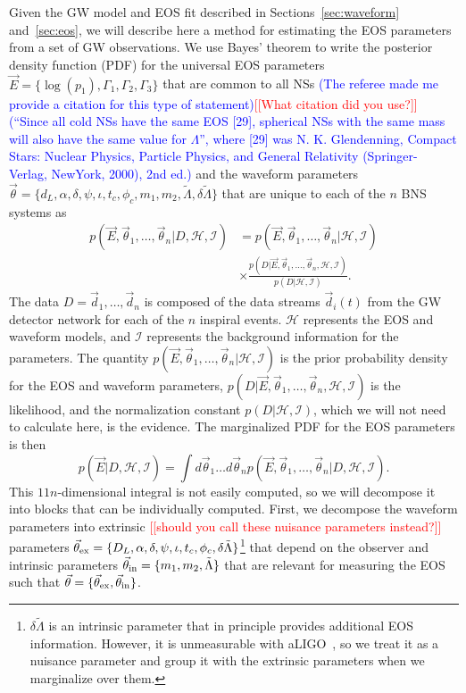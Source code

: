 \documentclass[twocolumn,prd,amssymb,aps,nofootinbib,showpacs,epsf]{revtex4}
\newcommand{\red}{\textcolor{red}}
\newcommand\ben[2]{\textcolor{red}{{#1}\sout{#2}}}
\newcommand\les[2]{\textcolor{blue}{{#1}\sout{#2}}}
\begin{document}
Given the GW model and EOS fit described in Sections~\ref{sec:waveform} and~\ref{sec:eos}, we will describe here a method for estimating the EOS parameters from a set of GW observations. We use Bayes' theorem to write the posterior density function (PDF) for the universal EOS parameters $\vec E = \{\log(p_1), \Gamma_1, \Gamma_2, \Gamma_3\}$ that are common to all NSs \les{(The referee made me provide a citation for this type of statement)}{}\ben{[[What citation did you use?]]}{} \les{(``Since all cold NSs have the same EOS [29], spherical NSs with the same mass will also have the same value for $\Lambda$'', where [29] was N. K. Glendenning, Compact Stars: Nuclear Physics, Particle Physics, and General Relativity (Springer- Verlag, NewYork, 2000), 2nd ed.)}{} and the waveform parameters $\vec\theta = \{d_L, \alpha, \delta, \psi, \iota, t_c, \phi_c, m_1, m_2, \tilde\Lambda, \delta\tilde\Lambda\}$ that are unique to each of the $n$ BNS systems as
\begin{equation}
\begin{split}
p(\vec E,\vec\theta_1,\dots,\vec\theta_n | D,\mathcal{H},\mathcal{I})
&= p(\vec E,\vec\theta_1,\dots,\vec\theta_n | \mathcal{H},\mathcal{I}) \\
& \times\frac{ p(D | \vec E,\vec\theta_1,\dots,\vec\theta_n,\mathcal{H},\mathcal{I}) }{ p(D | \mathcal{H},\mathcal{I}) }.
\end{split}
\end{equation}
The data $D = \vec d_1,\dots, \vec d_n$ is composed of the data streams $\vec d_i(t)$ from the GW detector network for each of the $n$ inspiral events. $\mathcal{H}$ represents the EOS and waveform models, and $\mathcal{I}$ represents the background information for the parameters. The quantity $p(\vec E,\vec\theta_1,\dots,\vec\theta_n | \mathcal{H},\mathcal{I})$ is the prior probability density for the EOS and waveform parameters, $p(D | \vec E,\vec\theta_1,\dots,\vec\theta_n,\mathcal{H},\mathcal{I})$ is the likelihood, and the normalization constant $p(D | \mathcal{H},\mathcal{I})$, which we will not need to calculate here, is the evidence. The marginalized PDF for the EOS parameters is then
\begin{equation}
\label{eq:margEOS}
p(\vec E | D,\mathcal{H},\mathcal{I}) = \int d\vec\theta_1 \dots d\vec\theta_n p(\vec E,\vec\theta_1,\dots,\vec\theta_n | D,\mathcal{H},\mathcal{I}).
\end{equation}
This $11n$-dimensional integral is not easily computed, so we will decompose it into blocks that can be individually computed. First, we decompose the waveform parameters into extrinsic \red{[[should you call these nuisance parameters instead?]]} parameters $\vec\theta_{\rm ex} = \{D_L, \alpha, \delta, \psi, \iota, t_c, \phi_c, \delta\tilde\Lambda\}$\footnote{$\delta\tilde\Lambda$ is an intrinsic parameter that in principle provides additional EOS information. However, it is unmeasurable with aLIGO~\cite{WadeCreightonOchsner2014}, so we treat it as a nuisance parameter and group it with the extrinsic parameters when we marginalize over them.} that depend on the observer and intrinsic parameters $\vec\theta_{\rm in} = \{m_1, m_2, \tilde\Lambda\}$ that are relevant for measuring the EOS such that $\vec\theta = \{\vec\theta_{\rm ex}, \vec\theta_{\rm in}\}$.
\end{document}
